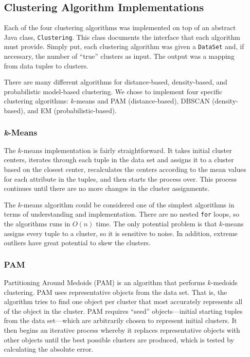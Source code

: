 \documentclass[11pt,letterpaper]{article}
\begin{document}
\subsection{Clustering Algorithm Implementations}
Each of the four clustering algorithms was implemented on top of an abstract Java class, \verb+Clustering+.
This class documents the interface that each algorithm must provide.  Simply put, each clustering algorithm
was given a \verb+DataSet+ and, if necessary, the number of ``true'' clusters as input.  The output was a mapping
from data tuples to clusters.

There are many different algorithms for distance-based, density-based, and probabilistic model-based clustering.  We chose to implement four specific clustering algorithms:  $k$-means and PAM (distance-based), DBSCAN (density-based), and EM (probabilistic-based).

\subsubsection{\textit{k}-Means} 
The $k$-means implementation is fairly straightforward.  It takes initial cluster centers, iterates through each tuple in the data set and assigns it to a cluster based on the closest center, recalculates the centers according to the mean values for each attribute in the tuples, and then starts the process over.  This process continues until there are no more changes in the cluster assignments.

The $k$-means algorithm could be considered one of the simplest algorithms in terms of understanding and implementation.  There are no nested \verb+for+ loops, so the algorithms runs in $O(n)$ time.  The only potential problem is that $k$-means assigns every tuple to a cluster, so it is sensitive to noise.  In addition, extreme outliers have great potential to skew the clusters.

\subsubsection{PAM}
Partitioning Around Medoids (PAM) is an algorithm that performs $k$-medoids clustering.  PAM uses representative objects from the data set.  That is, the algorithm tries to find one object per cluster that most accurately represents all of the object in the cluster.  PAM requires ``seed'' objects---initial starting tuples from the data set---which are arbitrarily chosen to represent initial clusters.  It then begins an iterative process whereby it replaces representative objects with other objects until the best possible clusters are produced, which is tested by calculating the absolute error.
\end{document}
